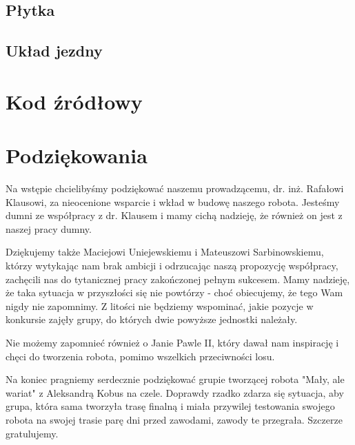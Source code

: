 \documentclass{article}
\begin{document}
\subsection{Płytka}


\subsection{Układ jezdny}


\section{Kod źródłowy}



\section{Podziękowania}

Na wstępie chcielibyśmy podziękować naszemu prowadzącemu, dr. inż. Rafałowi Klausowi,  za nieocenione wsparcie i wkład w budowę naszego robota. Jesteśmy dumni ze współpracy z dr. Klausem i mamy cichą nadzieję, że również on jest z naszej pracy dumny.

Dziękujemy także Maciejowi Uniejewskiemu i Mateuszowi Sarbinowskiemu, którzy  wytykając nam brak ambicji i odrzucając naszą propozycję współpracy, zachęcili nas do tytanicznej pracy zakończonej pełnym sukcesem. Mamy nadzieję, że taka sytuacja w przyszłości się nie powtórzy - choć obiecujemy, że tego Wam nigdy nie zapomnimy. Z litości nie będziemy wspominać, jakie pozycje w konkursie zajęły grupy, do których dwie powyższe jednostki należały.

Nie możemy zapomnieć również o Janie Pawle II, który dawał nam inspirację i chęci do tworzenia robota, pomimo wszelkich przeciwności losu.

Na koniec pragniemy serdecznie podziękować grupie tworzącej robota "Mały, ale wariat" z Aleksandrą Kobus na czele. Doprawdy rzadko zdarza się sytuacja, aby grupa, która sama tworzyła trasę finalną i miała przywilej testowania swojego robota na swojej trasie parę dni przed zawodami, zawody te przegrała. Szczerze gratulujemy.


\end{document}
